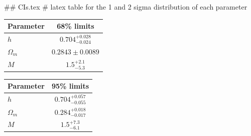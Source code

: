 ## CIs.tex
# latex table for the 1 and 2 sigma distribution of each parameter

\begin{tabular} { l  c}
 Parameter &  68\% limits\\
\hline
{\boldmath$h              $} & $0.704^{+0.028}_{-0.024}   $\\
{\boldmath$\Omega_m       $} & $0.2843\pm 0.0089          $\\
{\boldmath$M              $} & $1.5^{+2.1}_{-5.3}         $\\
\hline
\end{tabular}

\begin{tabular} { l  c}
 Parameter &  95\% limits\\
\hline
{\boldmath$h              $} & $0.704^{+0.057}_{-0.055}   $\\
{\boldmath$\Omega_m       $} & $0.284^{+0.018}_{-0.017}   $\\
{\boldmath$M              $} & $1.5^{+7.3}_{-6.1}         $\\
\hline
\end{tabular}
